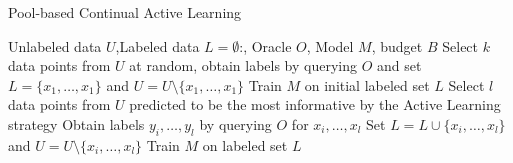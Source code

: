 \begin{algorithm}
    \caption{Pool-based Continual Active Learning} \label{alg:PoolBasedContinualActiveLearning}
    \begin{algorithmic}[1]
        \Require Unlabeled data $U$,Labeled data $L = \emptyset$:, Oracle $O$, Model $M$, budget $B$
        \State Select $k$ data points from $U$ at random, obtain labels by querying $O$ and set $L=\{x_1,\ldots,x_1\}$
        and $U = U \setminus \{x_1,\ldots,x_1\}$ 
        \State Train $M$ on initial labeled set $L$
            \State Select $l$ data points from $U$ predicted to be the most informative by the Active Learning strategy
            \State Obtain labels $y_i,\ldots,y_l$ by querying $O$ for $x_i,\ldots,x_l$
            \State Set $L= L \cup \{x_i,\ldots,x_l\}$ and $U = U \setminus \{x_i,\ldots,x_l\}$
            \State Train $M$ on labeled set $L$
        \EndWhile
    \end{algorithmic}
\end{algorithm}

